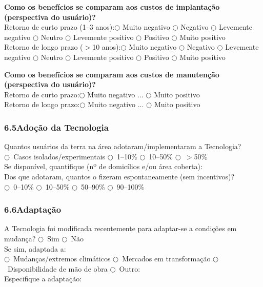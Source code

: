 \textbf{Como os benefícios se comparam aos custos de implantação (perspectiva do usuário)?}\\
Retorno de curto prazo (1--3 anos):\quad $\bigcirc$ Muito negativo \quad $\bigcirc$ Negativo \quad $\bigcirc$ Levemente negativo \quad $\bigcirc$ Neutro \quad $\bigcirc$ Levemente positivo \quad $\bigcirc$ Positivo \quad $\bigcirc$ Muito positivo\\
Retorno de longo prazo ($>$10 anos):\quad $\bigcirc$ Muito negativo \quad $\bigcirc$ Negativo \quad $\bigcirc$ Levemente negativo \quad $\bigcirc$ Neutro \quad $\bigcirc$ Levemente positivo \quad $\bigcirc$ Positivo \quad $\bigcirc$ Muito positivo

\medskip\noindent
\textbf{Como os benefícios se comparam aos custos de manutenção (perspectiva do usuário)?}\\
Retorno de curto prazo:\quad $\bigcirc$ Muito negativo \quad ... \quad $\bigcirc$ Muito positivo\\
Retorno de longo prazo:\quad $\bigcirc$ Muito negativo \quad ... \quad $\bigcirc$ Muito positivo

\subsubsection*{6.5\quad Adoção da Tecnologia}

Quantos usuários da terra na área adotaram/implementaram a Tecnologia?\\
$\bigcirc$~Casos isolados/experimentais \quad $\bigcirc$~1--10\% \quad $\bigcirc$~10--50\% \quad $\bigcirc$~$>$50\%\\[4pt]
Se disponível, quantifique (nº de domicílios e/ou área coberta): \dotfill\\[4pt]
Dos que adotaram, quantos o fizeram espontaneamente (sem incentivos)?\\
$\bigcirc$~0--10\% \quad $\bigcirc$~10--50\% \quad $\bigcirc$~50--90\% \quad $\bigcirc$~90--100\%

\subsubsection*{6.6\quad Adaptação}

A Tecnologia foi modificada recentemente para adaptar-se a condições em mudança? $\bigcirc$~Sim \quad $\bigcirc$~Não\\[4pt]
Se sim, adaptada a:\\
$\bigcirc$~Mudanças/extremos climáticos \quad $\bigcirc$~Mercados em transformação \quad $\bigcirc$~Disponibilidade de mão de obra \quad $\bigcirc$~Outro: \dotfill\\
Especifique a adaptação: \dotfill

